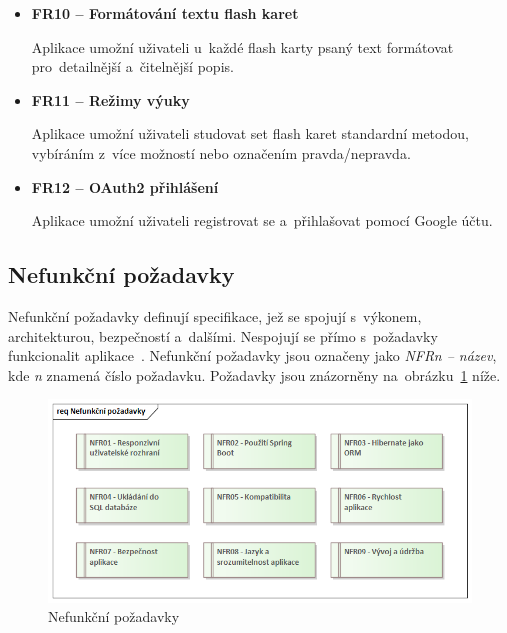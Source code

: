 \documentclass[twoside]{ctuthesis}
\begin{document}
\begin{itemize}
\item \textbf{FR10 -- Formátování textu flash karet}

Aplikace umožní uživateli u~každé flash karty psaný text formátovat pro~detailnější a~čitelnější popis.

\item \textbf{FR11 -- Režimy výuky}

Aplikace umožní uživateli studovat set flash karet standardní metodou, vybíráním z~více možností nebo označením pravda/nepravda.

\item \textbf{FR12 -- OAuth2 přihlášení}

Aplikace umožní uživateli registrovat se a~přihlašovat pomocí Google účtu.
\end{itemize}

\subsection{Nefunkční požadavky}

Nefunkční požadavky definují specifikace, jež se spojují s~výkonem, architekturou, bezpečností a~dalšími. Nespojují se přímo s~požadavky funkcionalit aplikace~\cite{frnfr}. Nefunkční požadavky jsou označeny jako \emph{NFRn -- název}, kde \emph{n} znamená číslo požadavku. Požadavky jsou znázorněny na~obrázku~\ref{fig:nfr} níže.

\begin{figure}[H]
\centering
\includegraphics[width=1\textwidth]{Nefunkční Požadavky.png}
\caption{Nefunkční požadavky}
\label{fig:nfr}
\end{figure}
\end{document}
